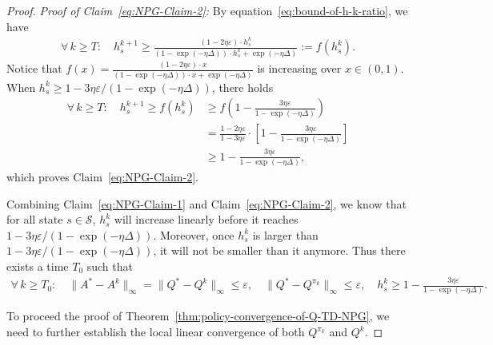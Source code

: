 \documentclass[10pt]{article}
\newcommand{\calS}{\mathcal{S}}
\newcommand{\ls}{\left}
\newcommand{\rs}{\right}
\theoremstyle{plain}
\theoremstyle{definition}
\begin{document}
\begin{proof}
    \textit{Proof of Claim~\ref{eq:NPG-Claim-2}:} By equation~\eqref{eq:bound-of-h-k-ratio}, we have
    \begin{align*}
        \forall\, k \geq T: \quad h_s^{k+1} \geq \frac{(1-2\eta\varepsilon) \cdot h^k_s}{(1-\exp(-\eta\Delta)) \cdot h_s^k  + \exp(-\eta\Delta)} := f(h_s^k).
    \end{align*}
    Notice that $f(x) = \frac{(1-2\eta\varepsilon) \cdot x}{(1-\exp(-\eta\Delta)) \cdot x + \exp(-\eta\Delta)}$ is increasing over $x\in(0,1)$. When $h_s^k \geq 1 - 3\eta\varepsilon / (1-\exp(-\eta\Delta))$, there holds
    \begin{align*}
        \forall\, k \geq T: \quad h_s^{k+1} \geq f(h_s^k) &\geq f\ls( 1 - \frac{3\eta\varepsilon}{1-\exp(-\eta\Delta)} \rs) \\
        &= \frac{1-2\eta\varepsilon}{1-3\eta\varepsilon} \cdot \ls[ 1 - \frac{3\eta\varepsilon}{1-\exp(-\eta\Delta)} \rs] \\
        &\geq 1 - \frac{3\eta\varepsilon}{1-\exp(-\eta\Delta)},
    \end{align*}
    which proves Claim~\ref{eq:NPG-Claim-2}.

    Combining Claim~\ref{eq:NPG-Claim-1} and Claim~\ref{eq:NPG-Claim-2}, we know that for all state $s\in\calS$, $h_s^k$ will increase linearly before it reaches $1-3\eta\varepsilon/(1-\exp(-\eta\Delta))$. Moreover, once $h_s^k$ is larger than $1 - 3\eta\varepsilon/(1-\exp(-\eta\Delta))$, it will not be smaller than it anymore. Thus there exists a time $T_0$ such that
    \begin{align*}
        \forall\, k \geq T_0 : \quad \| A^* - A^k \|_\infty = \| Q^* - Q^k \|_\infty \leq \varepsilon, \quad \| Q^* - Q^{\pi_k} \|_\infty \leq \varepsilon, \quad h_s^k \geq 1 - \frac{3\eta\varepsilon}{1-\exp(-\eta\Delta)}.
    \end{align*}

   To proceed the proof of Theorem~\ref{thm:policy-convergence-of-Q-TD-NPG}, we need to further establish the local linear convergence of both $Q^{\pi_k}$ and $Q^k$.


\end{proof}
\end{document}
